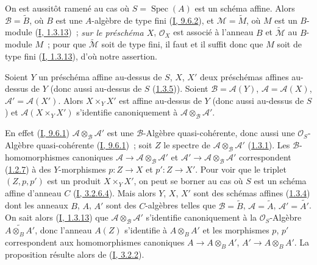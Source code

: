 On est aussitôt ramené au cas où $S=\operatorname{Spec}(A)$ est un schéma
affine. Alors $\mathcal{B}=\widetilde{B}$, où $B$ est une $A$-algèbre de type
fini (\hyperref[I.9.6.2-fr]{I, 9.6.2}), et
$\mathcal{M}=\widetilde{M}$, où $M$ est un $B$-module
(\hyperref[I.1.3.13-fr]{I, 1.3.13})~; \emph{sur le préschéma $X$},
$\mathcal{O}_X$ est associé à l'anneau $B$ et
$\widetilde{\mathcal{M}}$ au $B$-module $M$~; pour que
$\widetilde{\mathcal{M}}$ soit de type fini, il faut et il suffit donc que
$M$ soit de type fini (\hyperref[I.1.3.13-fr]{I, 1.3.13}), d'où notre
assertion.

\begin{proposition}[1.4.6]
\label{II.1.4.6-fr}
Soient $Y$ un préschéma affine au-dessus de $S$, $X$, $X'$ deux préschémas
affines au-dessus de $Y$ (donc aussi au-dessus de $S$
(\hyperref[II.1.3.5-fr]{1.3.5})). Soient
$\mathcal{B}=\mathcal{A}(Y)$, $\mathcal{A}=\mathcal{A}(X)$,
$\mathcal{A}'=\mathcal{A}(X')$. Alors $X\times_Y X'$ est affine au-dessus de
$Y$ (donc aussi au-dessus de $S$) et $\mathcal{A}(X\times_Y X')$
s'identifie canoniquement à $\mathcal{A}\otimes_{\mathcal{B}}\mathcal{A}'$.
\end{proposition}

En effet (\hyperref[I.9.6.1-fr]{I, 9.6.1})
$\mathcal{A}\otimes_{\mathcal{B}}\mathcal{A}'$ est une
$\mathcal{B}$-Algèbre quasi-cohérente, donc aussi une
$\mathcal{O}_S$-Algèbre quasi-cohérente
(\hyperref[I.9.6.1-fr]{I, 9.6.1})~; soit $Z$ le spectre de
$\mathcal{A}\otimes_{\mathcal{B}}\mathcal{A}'$
(\hyperref[II.1.3.1-fr]{1.3.1}). Les $\mathcal{B}$-homomorphismes canoniques
$\mathcal{A}\to\mathcal{A}\otimes_{\mathcal{B}}\mathcal{A}'$ et
$\mathcal{A}'\to\mathcal{A}\otimes_{\mathcal{B}}\mathcal{A}'$ correspondent
(\hyperref[II.1.2.7-fr]{1.2.7}) à des $Y$-morphismes $p:Z\to X$ et
$p':Z\to X'$. Pour voir que le triplet $(Z,p,p')$ est un produit
$X\times_Y X'$, on peut se borner au cas où $S$ est un schéma affine
d'anneau $C$ (\hyperref[I.3.2.6.4-fr]{I, 3.2.6.4}). Mais alors $Y$, $X$,
$X'$ sont des schémas affines (\hyperref[II.1.3.4-fr]{1.3.4}) dont les
anneaux $B$, $A$, $A'$ sont des $C$-algèbres telles que
$\mathcal{B}=\widetilde{B}$, $\mathcal{A}=\widetilde{A}$,
$\mathcal{A}'=\widetilde{A'}$. On sait alors
(\hyperref[I.1.3.13-fr]{I, 1.3.13}) que
$\mathcal{A}\otimes_{\mathcal{B}}\mathcal{A}'$ s'identifie canoniquement à
la $\mathcal{O}_S$-Algèbre $\widetilde{A\otimes_B A'}$, donc l'anneau
$A(Z)$ s'identifie à $A\otimes_B A'$ et les morphismes $p$, $p'$ correspondent
aux homomorphismes canoniques $A\to A\otimes_B A'$,
$A'\to A\otimes_B A'$. La proposition résulte alors de
(\hyperref[I.3.2.2-fr]{I, 3.2.2}).

